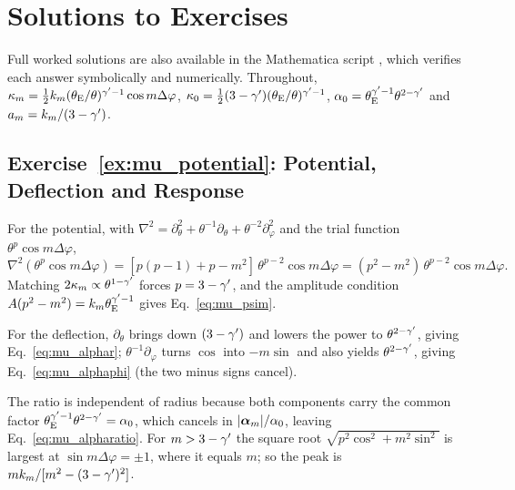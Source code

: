 
\section{Solutions to Exercises}
\label{sec:mu_solutions}

\noindent
Full worked solutions are also available in the Mathematica script
,
which verifies each answer symbolically and numerically.  Throughout,
$\kappa_m = \tfrac12 k_m(\theta_{\mathrm{E}}/\theta)^{\gamma'-1}\cos m\Delta\varphi$,
$\kappa_0 = \tfrac12(3-\gamma')(\theta_{\mathrm{E}}/\theta)^{\gamma'-1}$,
$\alpha_0 = \theta_{\mathrm{E}}^{\gamma'-1}\theta^{2-\gamma'}$ and $a_m = k_m/(3-\gamma')$.

\subsection*{Exercise~\ref{ex:mu_potential}: Potential, Deflection and Response}

For the potential, with $\nabla^2 = \partial_\theta^2 +
\theta^{-1}\partial_\theta + \theta^{-2}\partial_\varphi^2$ and the trial
function $\theta^p\cos m\Delta\varphi$,
\[
    \nabla^2(\theta^p\cos m\Delta\varphi)
    = [p(p-1)+p-m^2]\,\theta^{p-2}\cos m\Delta\varphi
    = (p^2-m^2)\,\theta^{p-2}\cos m\Delta\varphi .
\]
Matching $2\kappa_m\propto\theta^{1-\gamma'}$ forces $p=3-\gamma'$, and the
amplitude condition $A(p^2-m^2) = k_m\theta_{\mathrm{E}}^{\gamma'-1}$ gives
Eq.~\eqref{eq:mu_psim}.

For the deflection, $\partial_\theta$ brings down $(3-\gamma')$ and
lowers the power to $\theta^{2-\gamma'}$, giving Eq.~\eqref{eq:mu_alphar};
$\theta^{-1}\partial_\varphi$ turns $\cos$ into $-m\sin$ and also
yields $\theta^{2-\gamma'}$, giving Eq.~\eqref{eq:mu_alphaphi} (the two
minus signs cancel).

The ratio is independent of radius because both components carry the common factor
$\theta_{\mathrm{E}}^{\gamma'-1}\theta^{2-\gamma'} = \alpha_0$, which cancels in
$|\boldsymbol{\alpha}_m|/\alpha_0$, leaving Eq.~\eqref{eq:mu_alpharatio}.  For
$m>3-\gamma'$ the square root $\sqrt{p^2\cos^2+m^2\sin^2}$ is largest at
$\sin m\Delta\varphi=\pm1$, where it equals $m$; so the peak is
$m k_m/[m^2-(3-\gamma')^2]$.

